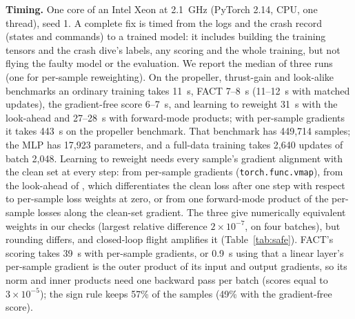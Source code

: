 \documentclass[preprint,12pt]{elsarticle}
\newcommand{\method}{FACT}
\begin{document}
\textbf{Timing.} One core of an Intel Xeon at 2.1~GHz (PyTorch 2.14, CPU, one thread), seed 1. A complete fix is timed from the logs and the crash record (states and commands) to a trained model: it includes building the training tensors and the crash dive's labels, any scoring and the whole training, but not flying the faulty model or the evaluation. We report the median of three runs (one for per-sample reweighting). On the propeller, thrust-gain and look-alike benchmarks an ordinary training takes 11~s, \method{} 7--8~s (11--12~s with matched updates), the gradient-free score 6--7~s, and learning to reweight 31~s with the look-ahead and 27--28~s with forward-mode products; with per-sample gradients it takes 443~s on the propeller benchmark. That benchmark has 449,714 samples; the MLP has 17,923 parameters, and a full-data training takes 2,640 updates of batch 2,048. Learning to reweight needs every sample's gradient alignment with the clean set at every step: from per-sample gradients (\texttt{torch.func.vmap}), from the look-ahead of \citet{ren2018l2rw}, which differentiates the clean loss after one step with respect to per-sample loss weights at zero, or from one forward-mode product of the per-sample losses along the clean-set gradient. The three give numerically equivalent weights in our checks (largest relative difference $2\times10^{-7}$, on four batches), but rounding differs, and closed-loop flight amplifies it (Table~\ref{tab:safe}). \method{}'s scoring takes 39~s with per-sample gradients, or 0.9~s using that a linear layer's per-sample gradient is the outer product of its input and output gradients, so its norm and inner products need one backward pass per batch (scores equal to $3\times10^{-5}$); the sign rule keeps 57\% of the samples (49\% with the gradient-free score).
\end{document}

